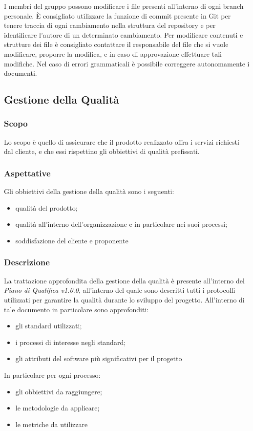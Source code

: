 			I membri del gruppo possono modificare i file presenti all'interno di ogni branch personale. È consigliato utilizzare la funzione di commit presente in Git per tenere traccia di ogni cambiamento nella struttura del repository e per identificare l'autore di un determinato cambiamento. Per modificare contenuti e strutture dei file è consigliato contattare il responsabile del file che si vuole modificare, proporre la modifica, e in caso di approvazione effettuare tali modifiche. Nel caso di errori grammaticali è possibile correggere autonomamente i documenti. 
	
	\subsection{Gestione della Qualità}
		\subsubsection{Scopo}
		Lo scopo è quello di assicurare che il prodotto realizzato offra i servizi richiesti dal cliente, e che essi rispettino gli obbiettivi di qualità prefissati.
		
		\subsubsection{Aspettative}
		Gli obbiettivi della gestione della qualità sono i seguenti:
		\begin{itemize}
			\item qualità del prodotto;
			\item qualità all'interno dell'organizzazione e in particolare nei suoi processi;
			\item soddisfazione del cliente e proponente
		\end{itemize}
		
		\subsubsection{Descrizione}
		La trattazione approfondita della gestione della qualità è presente all'interno del \textit{Piano di Qualifica v1.0.0}, all'interno del quale sono descritti tutti i protocolli utilizzati per garantire la qualità durante lo sviluppo del progetto. All'interno di tale documento in particolare sono approfonditi:
		\begin{itemize}
			\item gli standard utilizzati;
			\item i processi di interesse negli standard;
			\item gli attributi del software più significativi per il progetto
		\end{itemize}
		In particolare per ogni processo:
		\begin{itemize}
			\item gli obbiettivi da raggiungere;
			\item le metodologie da applicare;
			\item le metriche da utilizzare
		\end{itemize}
		
